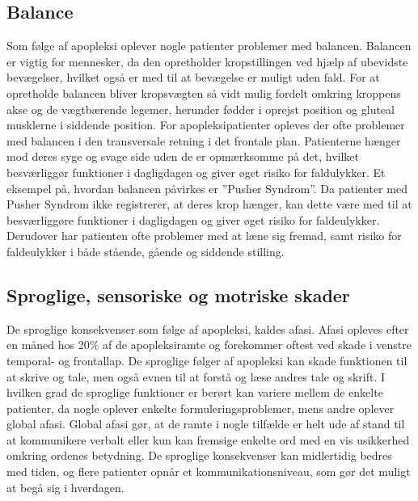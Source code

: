 \subsection{Balance}
Som følge af apopleksi oplever nogle patienter problemer med balancen. Balancen er vigtig for mennesker, da den opretholder kropstillingen ved hjælp af ubevidste bevægelser, hvilket også er med til at bevægelse er muligt uden fald. For at opretholde balancen bliver kropsvægten så vidt mulig fordelt omkring kroppens akse og de vægtbærende legemer, herunder fødder i oprejst position og gluteal musklerne i siddende position.\cite{Nichols1997}   
For apopleksipatienter opleves der ofte problemer med balancen i den transversale retning i det frontale plan. Patienterne hænger mod deres syge og svage side uden de er opmærksomme på det, hvilket besværliggør funktioner i dagligdagen og giver øget risiko for faldulykker. Et eksempel på, hvordan balancen påvirkes er ”Pusher Syndrom”. Da patienter med Pusher Syndrom ikke registrerer, at deres krop hænger, kan dette være med til at besværliggøre funktioner i dagligdagen og giver øget risiko for faldeulykker. Derudover har patienten ofte problemer med at læne sig fremad, samt risiko for faldeulykker i både stående, gående og siddende stilling. \cite{Karnath2003}


\subsection{Sproglige, sensoriske og motriske skader}
De sproglige konsekvenser som følge af apopleksi, kaldes afasi. Afasi opleves efter en måned hos 20\% af de apopleksiramte og forekommer oftest ved skade i venstre temporal- og frontallap. De sproglige følger af apopleksi kan skade funktionen til at skrive og tale, men også evnen til at forstå og læse andres tale og skrift. I hvilken grad de sproglige funktioner er berørt kan variere mellem de enkelte patienter, da nogle oplever enkelte formuleringsproblemer, mens andre oplever global afasi. Global afasi gør, at de ramte i nogle tilfælde er helt ude af stand til at kommunikere verbalt eller kun kan fremsige enkelte ord med en vis usikkerhed omkring ordenes betydning.
De sproglige konsekvenser kan midlertidig bedres med tiden, og flere patienter opnår et kommunikationsniveau, som gør det muligt at begå sig i hverdagen.\cite{Muus2008}

